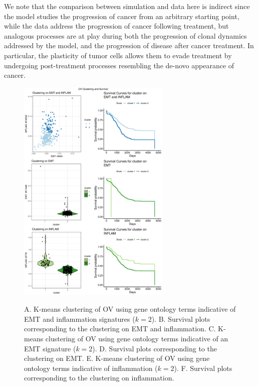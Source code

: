 \documentclass[11pt]{article}
\begin{document}
We note that the comparison between simulation and data here is indirect since the model studies the progression of cancer from an arbitrary starting point, while the data address the progression of cancer following treatment, but analogous processes are at play during both the progression of  clonal dynamics addressed by the model, and the progression of disease after cancer treatment.
In particular, the plasticity of tumor cells allows them to evade treatment by undergoing post-treatment processes resembling the de-novo appearance of cancer\cite{sanchez2018slow}.



\begin{figure}
\center
{\includegraphics[width=0.65\textwidth]{Figure6/OV.pdf}}
\caption{A. K-means clustering of OV using gene ontology terms indicative of EMT and inflammation signatures ($k=2$).
B. Survival plots corresponding to the clustering on EMT and inflammation.
C. K-means clustering of OV using gene ontology terms indicative of an EMT signature ($k=2$).
D. Survival plots corresponding to the clustering on EMT.
E. K-means clustering of OV using gene ontology terms indicative of inflammation ($k=2$).
F. Survival plots corresponding to the clustering on inflammation.}
\label{fig:OV}
\end{figure}
\end{document}
